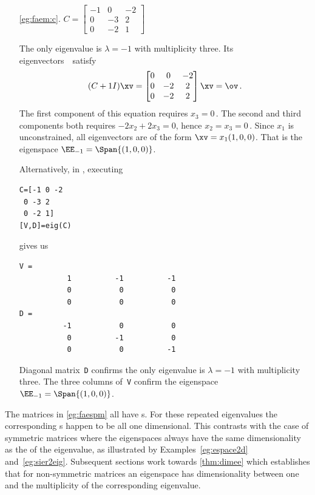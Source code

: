 \begin{example}
\begin{itemize}
\item[\ref{eg:faem:c}.]
\(C=\begin{bmatrix}-1&0&-2
\\0&-3&2
\\0&-2&1\end{bmatrix}\)
\begin{solution} 
The only eigenvalue is \(\lambda=-1\) with multiplicity three.
Its eigenvectors~\xv\ satisfy
\begin{equation*}
(C+1 I)\xv=\begin{bmatrix} 0&0&-2
\\0&-2&2
\\0&-2&2 \end{bmatrix}\xv=\ov\,.
\end{equation*}
The first component of this equation requires \(x_3=0\)\,.  
The second and third components both requires \(-2x_2+2x_3=0\), hence \(x_2=x_3=0\)\,.
Since \(x_1\) is unconstrained, all eigenvectors are of the form \(\xv=x_1(1,0,0)\).  
That is the eigenspace  \(\EE_{-1}=\Span\{(1,0,0)\}\).

Alternatively, in \script, executing 
\begin{verbatim}
C=[-1 0 -2
 0 -3 2
 0 -2 1]
[V,D]=eig(C)
\end{verbatim}
gives us
\begin{verbatim}
V =
           1          -1          -1
           0           0           0
           0           0           0
D =
          -1           0           0
           0          -1           0
           0           0          -1
\end{verbatim}
Diagonal matrix~\verb|D| confirms the only eigenvalue is \(\lambda=-1\) with multiplicity three.  
The three columns of~\verb|V| confirm the eigenspace \(\EE_{-1}=\Span\{(1,0,0)\}\).
\end{solution}

\end{itemize}
\end{example}

The matrices in \autoref{eg:faespm} all have s.  
For these repeated eigenvalues the corresponding s happen to be all one dimensional.
This contrasts with the case of symmetric matrices where the eigenspaces always have the same dimensionality as the  of the eigenvalue, as illustrated by Examples~\ref{eg:espace2d} and~\ref{eg:sier2eig}.
Subsequent sections work towards \autoref{thm:dimee} which establishes that for non-symmetric matrices an eigenspace has dimensionality between one and the multiplicity of the corresponding eigenvalue.


